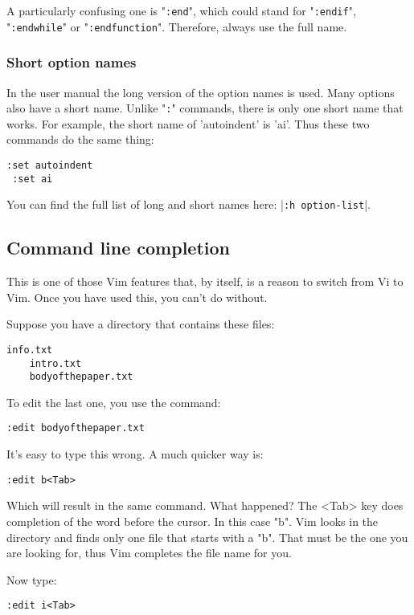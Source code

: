 A particularly confusing one is "\verb!:end!", which could stand for "\verb!:endif!", "\verb!:endwhile!" or "\verb!:endfunction!".
Therefore, always use the full name.
\subsubsection{Short option names}
In the user manual the long version of the option names is used.
Many options also have a short name.
Unlike "\verb!:!" commands, there is only one short name that works.
For example, the short name of 'autoindent' is 'ai'.
Thus these two commands do the same thing:

\begin{Verbatim}[samepage=true]
 :set autoindent
 :set ai
\end{Verbatim}

You can find the full list of long and short names here: |\verb!:h option-list!|.
\subsection{Command line completion}
This is one of those Vim features that, by itself, is a reason to switch from Vi to Vim.
Once you have used this, you can't do without.

Suppose you have a directory that contains these files:

\begin{Verbatim}[samepage=true]
    info.txt
    intro.txt
    bodyofthepaper.txt
\end{Verbatim}

To edit the last one, you use the command:

\begin{Verbatim}[samepage=true]
 :edit bodyofthepaper.txt
\end{Verbatim}

It's easy to type this wrong.
A much quicker way is:

\begin{Verbatim}[samepage=true]
 :edit b<Tab>
\end{Verbatim}

Which will result in the same command.
What happened?
The <Tab> key does completion of the word before the cursor.
In this case "b".
Vim looks in the directory and finds only one file that starts with a "b".
That must be the one you are looking for, thus Vim completes the file name for you.

Now type:

\begin{Verbatim}[samepage=true]
 :edit i<Tab>
\end{Verbatim}

